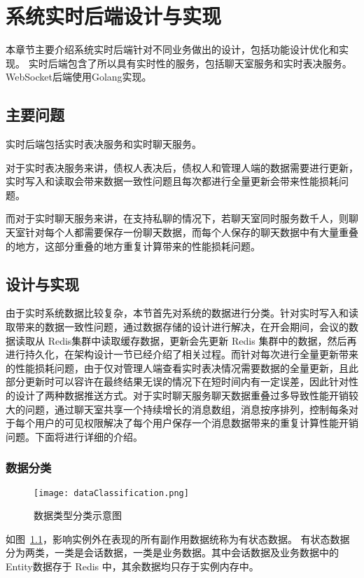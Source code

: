 
\chapter{系统实时后端设计与实现}
本章节主要介绍系统实时后端针对不同业务做出的设计，包括功能设计优化和实现。
实时后端包含了所以具有实时性的服务，包括聊天室服务和实时表决服务。WebSocket后端使用Golang实现。

  \section{主要问题}
  实时后端包括实时表决服务和实时聊天服务。
  
  对于实时表决服务来讲，债权人表决后，债权人和管理人端的数据需要进行更新，实时写入和读取会带来数据一致性问题且每次都进行全量更新会带来性能损耗问题。

  而对于实时聊天服务来讲，在支持私聊的情况下，若聊天室同时服务数千人，则聊天室针对每个人都需要保存一份聊天数据，而每个人保存的聊天数据中有大量重叠的地方，这部分重叠的地方重复计算带来的性能损耗问题。

  \section{设计与实现}
  由于实时系统数据比较复杂，本节首先对系统的数据进行分类。针对实时写入和读取带来的数据一致性问题，通过数据存储的设计进行解决，在开会期间，会议的数据读取从 Redis集群中读取缓存数据，更新会先更新 Redis 集群中的数据，然后再进行持久化，在架构设计一节已经介绍了相关过程。而针对每次进行全量更新带来的性能损耗问题，由于仅对管理人端查看实时表决情况需要数据的全量更新，且此部分更新时可以容许在最终结果无误的情况下在短时间内有一定误差，因此针对性的设计了两种数据推送方式。对于实时聊天服务聊天数据重叠过多导致性能开销较大的问题，通过聊天室共享一个持续增长的消息数组，消息按序排列，控制每条对于每个用户的可见权限解决了每个用户保存一个消息数据带来的重复计算性能开销问题。下面将进行详细的介绍。

  \subsection{数据分类}
\begin{figure}[!htp]
  \centering
  \texttt{[image: dataClassification.png]}
  \caption[数据分类]
    {数据类型分类示意图}
 \label{fig:dataClassification}
\end{figure}

如图~\ref{fig:dataClassification}，影响实例外在表现的所有副作用数据统称为有状态数据。
有状态数据分为两类，一类是会话数据，一类是业务数据。其中会话数据及业务数据中的Entity数据存于 Redis 中，其余数据均只存于实例内存中。

